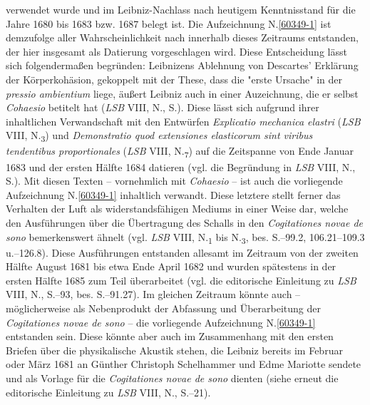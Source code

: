 verwendet wurde und im Leibniz-Nachlass nach heutigem Kenntnisstand für die Jahre 1680 bis 1683 bzw. 1687 belegt ist. %
Die Aufzeichnung N.\;\ref{60349-1} ist demzufolge aller Wahrscheinlichkeit nach innerhalb dieses Zeitraums entstanden, %
der hier insgesamt als Datierung vorgeschlagen wird.
Diese Entscheidung lässt sich folgendermaßen begründen:
\pend%
\pstart%
Leibnizens Ablehnung von Descartes' Erklärung der Körperkohäsion, gekoppelt mit der These, dass die "erste Ursache" in der \textit{pressio ambientium} liege, äußert Leibniz auch in einer Auzeichnung, die er selbst \textit{Cohaesio} betitelt hat (\textit{LSB} VIII, N., S.).\cite{02615}
Diese lässt sich aufgrund ihrer inhaltlichen Verwandschaft mit den Entwürfen \textit{Explicatio mechanica elastri} (\textit{LSB} VIII, N.\textsubscript{3})\cite{01437} und \textit{Demonstratio quod extensiones elasticorum sint viribus tendentibus proportionales} (\textit{LSB} VIII, N.\textsubscript{7})\cite{01438} auf die Zeitspanne von Ende Januar 1683 und der ersten Hälfte 1684 datieren (vgl. die Begründung in \textit{LSB} VIII, N., S.).\cite{02615} 
Mit diesen Texten -- vornehmlich mit \textit{Cohaesio} -- ist auch die vorliegende Aufzeichnung N.\;\ref{60349-1} inhaltlich verwandt.
\pend%
\pstart%
Diese letztere %
stellt ferner das Verhalten der Luft als widerstandsfähigen Mediums in einer Weise dar, welche den Ausführungen über die Übertragung des Schalls in den \textit{Cogitationes novae de sono} bemerkenswert ähnelt (vgl. \textit{LSB} VIII, N.\textsubscript{1} bis N.\textsubscript{3}, bes. S.--99.2, 106.21--109.3 u.--126.8).\cite{02527}\cite{01481}\cite{02529}
Diese Ausführungen entstanden allesamt im Zeitraum von der zweiten Hälfte August 1681 bis etwa Ende April 1682 und wurden spätestens in der ersten Hälfte 1685 zum Teil überarbeitet (vgl. die editorische Einleitung zu \textit{LSB} VIII, N., S.--93, bes. S.--91.27).\cite{02526}
Im gleichen Zeitraum könnte auch -- möglicherweise als Nebenprodukt der Abfassung und Überarbeitung %
der \textit{Cogitationes novae de sono} -- die vorliegende Aufzeichnung N.\;\ref{60349-1} entstanden sein.
Diese könnte aber auch im Zusammenhang mit den ersten Briefen über die physikalische Akustik stehen, die Leibniz bereits im Februar oder März 1681 an Günther Christoph Schelhammer und Edme Mariotte sendete und als Vorlage für die \textit{Cogitationes novae de sono} dienten (siehe erneut die editorische Einleitung zu \textit{LSB} VIII, N., S.--21).\cite{02526}
